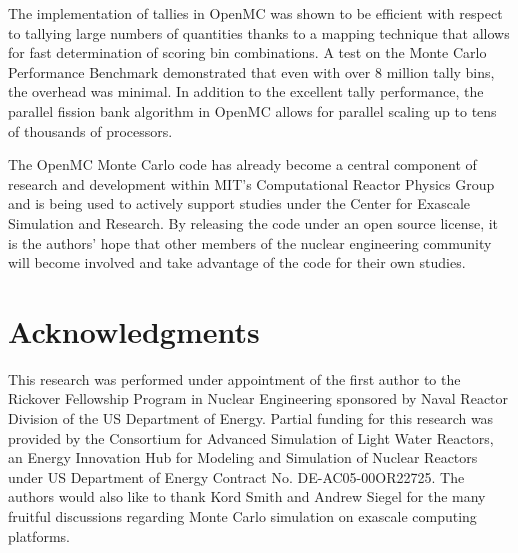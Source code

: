 \documentclass[authoryear,preprint]{elsarticle}
\begin{document}
The implementation of tallies in OpenMC was shown to be efficient with respect
to tallying large numbers of quantities thanks to a mapping technique that
allows for fast determination of scoring bin combinations. A test on the Monte
Carlo Performance Benchmark demonstrated that even with over 8 million tally
bins, the overhead was minimal. In addition to the excellent tally performance,
the parallel fission bank algorithm in OpenMC allows for parallel scaling up to
tens of thousands of processors.

The OpenMC Monte Carlo code has already become a central component of research
and development within MIT's Computational Reactor Physics Group and is being
used to actively support studies under the Center for Exascale Simulation and
Research. By releasing the code under an open source license, it is the authors'
hope that other members of the nuclear engineering community will become
involved and take advantage of the code for their own studies.

\section*{Acknowledgments}

This research was performed under appointment of the first author to the
Rickover Fellowship Program in Nuclear Engineering sponsored by Naval Reactor
Division of the US Department of Energy. Partial funding for this research was
provided by the Consortium for Advanced Simulation of Light Water Reactors, an
Energy Innovation Hub for Modeling and Simulation of Nuclear Reactors under US
Department of Energy Contract No. DE-AC05-00OR22725. The authors would also like
to thank Kord Smith and Andrew Siegel for the many fruitful discussions
regarding Monte Carlo simulation on exascale computing platforms.



\end{document}

